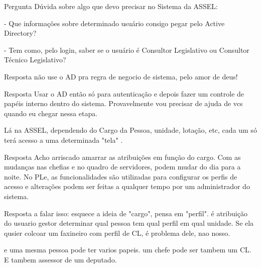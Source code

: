 \begin{pergunta}[1]{Pergunta}
	Dúvida sobre algo que devo precisar no Sistema da ASSEL: 
	
	- Que informações sobre determinado usuário consigo pegar pelo Active Directory?
	
	- Tem como, pelo login, saber se o usuário é Consultor Legislativo ou Consultor Técnico Legislativo?
\end{pergunta}	

\begin{resposta}[1]{Resposta}
	não use o AD pra regra de negocio de sistema, pelo amor de deus!
\end{resposta}	

\begin{resposta}[1]{Resposta}
	Usar o AD então só para autenticação e depois fazer um controle de papéis interno dentro do sistema. Provavelmente vou precisar de ajuda de vcs quando eu chegar nessa etapa.
	
	Lá na ASSEL, dependendo do Cargo da Pessoa, unidade, lotação, etc, cada um só terá acesso a uma determinada "tela" .
\end{resposta}	

\begin{resposta}[1]{Resposta}
	Acho arriscado amarrar as atribuições em função do cargo. Com as mudanças nas chefias e no quadro de servidores, podem mudar do dia para a noite. No PLe, as funcionalidades são utilizadas para configurar os perfis de acesso e alterações podem ser feitas a qualquer tempo por um administrador do sistema.
\end{resposta}	

\begin{resposta}[1]{Resposta}
	a falar isso: esquece a ideia de "cargo", pensa em "perfil". é atribuição do usuario gestor determinar qual pessoa tem qual perfil em qual unidade. Se ela qusier colcoar um faxineiro com perfil de CL, é problema dele, nao nosso.
	
	e uma mesma pessoa pode ter varios papeis. um chefe pode ser tambem um CL. E tambem assessor de um deputado.
\end{resposta}	
